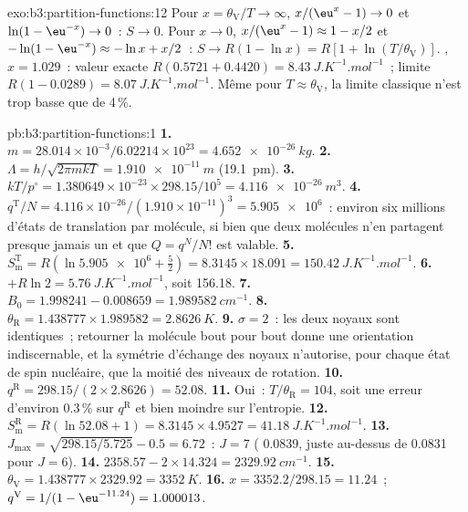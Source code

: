 \begin{solution}{exo:b3:partition-functions:12}
Pour $x = \theta_{\mathrm V}/T \to \infty$, $x/(\eu^x - 1) \to 0$ et $\ln(1 - \eu^{-x}) \to 0$~: $S \to 0$. Pour $x \to 0$,
$x/(\eu^x - 1) \approx 1 - x/2$ et $-\ln(1 - \eu^{-x}) \approx -\ln x + x/2$~: $S \to R(1 - \ln x) = R[1 + \ln(T/\theta_{\mathrm V})]$.
, $x = 1.029$~: valeur exacte $R(0.5721 + 0.4420) = \qty{8.43}{J.K^{-1}.mol^{-1}}$~;
limite $R(1 - 0.0289) =
\qty{8.07}{J.K^{-1}.mol^{-1}}$. Même pour $T \approx \theta_{\mathrm V}$,
la limite classique n'est trop basse que de 4\,\%.
\end{solution}

\begin{solution}{pb:b3:partition-functions:1}
\textbf{1.} $m = 28.014\times10^{-3}/6.02214\times10^{23} = \qty{4.652e-26}{kg}$.
\textbf{2.} $\Lambda = h/\sqrt{2\pi mkT} = \qty{1.910e-11}{m}$ (\qty{19.1}{pm}).
\textbf{3.} $kT/p^\circ = 1.380649\times10^{-23} \times 298.15/10^5 = \qty{4.116e-26}{m^3}$.
\textbf{4.} $q^{\mathrm T}/N = 4.116\times10^{-26}/(1.910\times10^{-11})^3 = \num{5.905e6}$~:
environ six millions d'états de translation par molécule, si bien que
deux molécules n'en partagent presque jamais un et que
$Q = q^N/N!$ est valable.
\textbf{5.} $S^{\mathrm T}_{\mathrm m} = R(\ln\num{5.905e6} + \frac52) = 8.3145 \times 18.091 = \qty{150.42}{J.K^{-1}.mol^{-1}}$.
\textbf{6.} $+R\ln2 = \qty{5.76}{J.K^{-1}.mol^{-1}}$, soit \num{156.18}.
\textbf{7.} $B_0 = 1.998241 - 0.008659 = \qty{1.989582}{cm^{-1}}$.
\textbf{8.} $\theta_{\mathrm R} = 1.438777 \times 1.989582 = \qty{2.8626}{K}$.
\textbf{9.} $\sigma = 2$~: les deux noyaux sont identiques~; retourner la
molécule bout pour bout donne une orientation indiscernable, et la
symétrie d'échange des noyaux n'autorise, pour chaque état de spin
nucléaire, que la moitié des niveaux de rotation.
\textbf{10.} $q^{\mathrm R} = 298.15/(2 \times 2.8626) = 52.08$.
\textbf{11.} Oui~: $T/\theta_{\mathrm R} = 104$, soit une erreur d'environ
0.3\,\% sur $q^{\mathrm R}$ et bien moindre sur l'entropie.
\textbf{12.} $S^{\mathrm R}_{\mathrm m} = R(\ln52.08 + 1) = 8.3145 \times 4.9527 = \qty{41.18}{J.K^{-1}.mol^{-1}}$.
\textbf{13.} $J_{\max} = \sqrt{298.15/5.725} - 0.5 = 6.72$~: $J = 7$
( 0.0839, juste au-dessus de
0.0831 pour $J = 6$).
\textbf{14.} $2358.57 - 2 \times 14.324 = \qty{2329.92}{cm^{-1}}$.
\textbf{15.} $\theta_{\mathrm V} = 1.438777 \times 2329.92 = \qty{3352}{K}$.
\textbf{16.} $x = 3352.2/298.15 = 11.24$~; $q^{\mathrm V} = 1/(1 - \eu^{-11.24}) = 1.000013$.

\end{solution}

